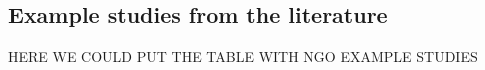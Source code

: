 \subsection{Example studies from the literature}
HERE WE COULD PUT THE TABLE WITH NGO EXAMPLE STUDIES
